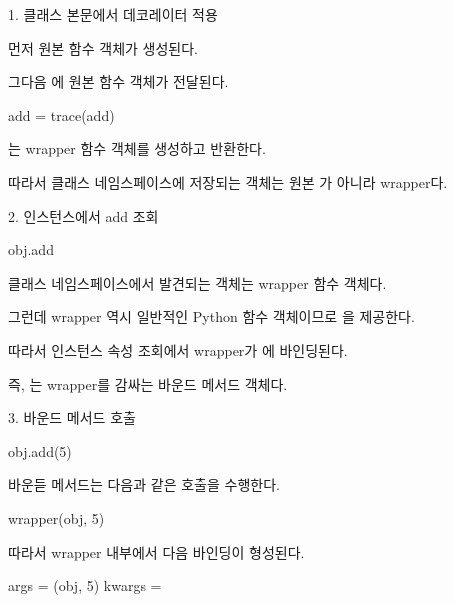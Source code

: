 \begin{dhknote}
\begin{dhksmry}[centered]
1. 클래스 본문에서 데코레이터 적용
\end{dhksmry}
\end{dhknote}

먼저 원본  함수 객체가 생성된다.

그다음 에 원본 함수 객체가 전달된다.

\begin{dhkcode}
add = trace(add)
\end{dhkcode}

는 wrapper 함수 객체를 생성하고 반환한다.

따라서 클래스 네임스페이스에 저장되는 객체는 원본 가 아니라 wrapper다.

\begin{dhknote}
\begin{dhksmry}[centered]
2. 인스턴스에서 add 조회
\end{dhksmry}
\end{dhknote}

\begin{dhkcode}
obj.add
\end{dhkcode}

클래스 네임스페이스에서 발견되는 객체는 wrapper 함수 객체다.

그런데 wrapper 역시 일반적인 Python 함수 객체이므로 을 제공한다.

따라서 인스턴스 속성 조회에서 wrapper가 에 바인딩된다.

즉, 는 wrapper를 감싸는 바운드 메서드 객체다.

\begin{dhknote}
\begin{dhksmry}[centered]
3. 바운드 메서드 호출
\end{dhksmry}
\end{dhknote}

\begin{dhkcode}
obj.add(5)
\end{dhkcode}

바운듣 메서드는 다음과 같은 호출을 수행한다.

\begin{dhkcode}
wrapper(obj, 5)
\end{dhkcode}

따라서 wrapper 내부에서 다음 바인딩이 형성된다.

\begin{dhkzsh}
args = (obj, 5)
kwargs = {}
\end{dhkzsh}

